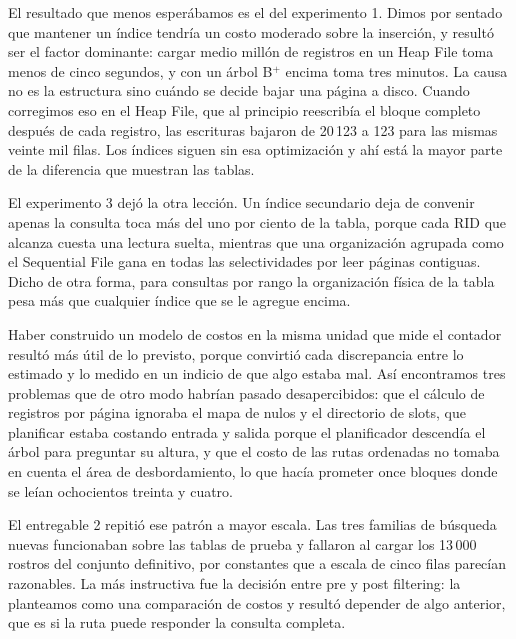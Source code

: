 \documentclass[a4paper,12pt]{article}
\begin{document}
El resultado que menos esperábamos es el del experimento 1. Dimos por sentado
que mantener un índice tendría un costo moderado sobre la inserción, y resultó
ser el factor dominante: cargar medio millón de registros en un Heap File toma
menos de cinco segundos, y con un árbol B$^+$ encima toma tres minutos. La causa
no es la estructura sino cuándo se decide bajar una página a disco. Cuando
corregimos eso en el Heap File, que al principio reescribía el bloque completo
después de cada registro, las escrituras bajaron de 20\,123 a 123 para las
mismas veinte mil filas. Los índices siguen sin esa optimización y ahí está la
mayor parte de la diferencia que muestran las tablas.

El experimento 3 dejó la otra lección. Un índice secundario deja de convenir
apenas la consulta toca más del uno por ciento de la tabla, porque cada RID que
alcanza cuesta una lectura suelta, mientras que una organización agrupada como
el Sequential File gana en todas las selectividades por leer páginas contiguas.
Dicho de otra forma, para consultas por rango la organización física de la tabla
pesa más que cualquier índice que se le agregue encima.

Haber construido un modelo de costos en la misma unidad que mide el contador
resultó más útil de lo previsto, porque convirtió cada discrepancia entre lo
estimado y lo medido en un indicio de que algo estaba mal. Así encontramos tres
problemas que de otro modo habrían pasado desapercibidos: que el cálculo de
registros por página ignoraba el mapa de nulos y el directorio de slots, que
planificar estaba costando entrada y salida porque el planificador descendía el
árbol para preguntar su altura, y que el costo de las rutas ordenadas no tomaba
en cuenta el área de desbordamiento, lo que hacía prometer once bloques donde se
leían ochocientos treinta y cuatro.

El entregable 2 repitió ese patrón a mayor escala. Las tres familias de búsqueda
nuevas funcionaban sobre las tablas de prueba y fallaron al cargar los 13\,000
rostros del conjunto definitivo, por constantes que a escala de cinco filas
parecían razonables. La más instructiva fue la decisión entre pre y post
filtering: la planteamos como una comparación de costos y resultó depender de
algo anterior, que es si la ruta puede responder la consulta completa.

\newpage
\appendix
\end{document}
